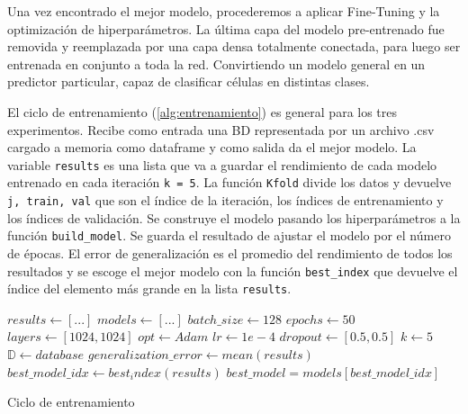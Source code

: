 Una vez encontrado el mejor modelo, procederemos a aplicar Fine-Tuning y la
optimización de hiperparámetros. La última capa del modelo pre-entrenado fue
removida y reemplazada por una capa densa totalmente conectada, para luego ser
entrenada en conjunto a toda la red. Convirtiendo un modelo general en un
predictor particular, capaz de clasificar células en distintas clases.

El ciclo de entrenamiento (\autoref{alg:entrenamiento}) es general para los tres
experimentos. Recibe como entrada una BD representada por un archivo .csv
cargado a memoria como dataframe y como salida da el mejor modelo. La variable
\texttt{results} es una lista que va a guardar el rendimiento de cada
modelo entrenado en cada iteración \texttt{k = 5}. La función
\texttt{Kfold} divide los datos y devuelve \texttt{j,
train, val} que son el índice de la iteración, los índices de entrenamiento y
los índices de validación. Se construye el modelo pasando los hiperparámetros a
la función \texttt{build_model}. Se guarda el resultado de ajustar el
modelo por el número de épocas. El error de generalización es el promedio del
rendimiento de todos los resultados y se escoge el mejor modelo con la función
\texttt{best_index} que devuelve el índice del elemento más grande en
la lista \texttt{results}.

\begin{algorithm}[H]
    \SetAlgoLined
    $results \longleftarrow [ ... ]$
    \BlankLine
    $models \longleftarrow [ ... ]$
    \BlankLine
    $batch\_size \longleftarrow 128$
    \BlankLine
    $epochs \longleftarrow 50$
    \BlankLine
    $layers \longleftarrow [1024, 1024]$
    \BlankLine
    $opt \longleftarrow Adam$
    \BlankLine
    $lr \longleftarrow 1e-4$
    \BlankLine
    $dropout \longleftarrow [0.5, 0.5]$
    \BlankLine
    $k \longleftarrow 5$
    \BlankLine
    $\mathbb{D}  \longleftarrow database$
    \BlankLine
    \BlankLine
    $generalization\_error \longleftarrow mean(results)$
    \BlankLine
    $best\_model\_idx \longleftarrow best_index(results)$
    \BlankLine
    $best\_model = models[best\_model\_idx]$
    \caption{Ciclo de entrenamiento}\label{alg:entrenamiento}
\end{algorithm}


